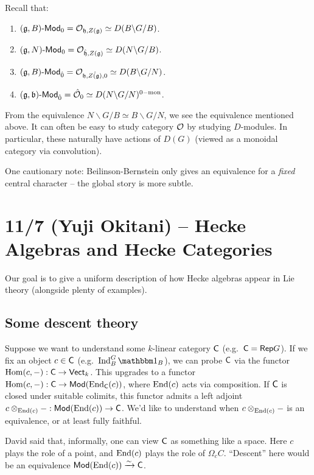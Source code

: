 \documentclass{article}
\begin{document}
Recall that:
\begin{enumerate}
	\item $(\mathfrak{g}, B)\text{-}\mathsf{Mod}_0 = \mathcal{O}_{\mathfrak{h},Z(\mathfrak{g})} \simeq D(B \backslash G / B)$.
	\item $(\mathfrak{g}, N)\text{-}\mathsf{Mod}_0 = \mathcal{O}_{\hat{\mathfrak{h}},Z(\mathfrak{g})} \simeq D(N \backslash G / B)$.
	\item $(\mathfrak{g}, B)\text{-}\mathsf{Mod}_{\hat{0}} = \mathcal{O}_{\mathfrak{h},\hat{Z(\mathfrak{g})},0} \simeq D(B \backslash G / N)$.
	\item $(\mathfrak{g}, \mathfrak{b})\text{-}\mathsf{Mod}_{\hat{0}} = \hat{\mathcal{O}}_0 \simeq D(N \backslash G / N)^{0\mathrm{-mon}}$.
\end{enumerate}

From the equivalence $N \backslash G / B \simeq B \backslash G / N$, we see the equivalence mentioned above.
It can often be easy to study category $\mathcal{O}$ by studying $D$-modules.
In particular, these naturally have actions of $D(G)$ (viewed as a monoidal category via convolution).

One cautionary note: Beilinson-Bernstein only gives an equivalence for a \emph{fixed} central character -- the global story is more subtle.

\section{11/7 (Yuji Okitani) -- Hecke Algebras and Hecke Categories}

Our goal is to give a uniform description of how Hecke algebras appear in Lie theory (alongside plenty of examples).

\subsection{Some descent theory}

Suppose we want to understand some $k$-linear category $\mathsf{C}$ (e.g.\ $\mathsf{C} = \mathsf{Rep} G$).
If we fix an object $c \in \mathsf{C}$ (e.g.\ $\Indop_B^G \onebb_B$), we can probe $\mathsf{C}$ via the functor $\operatorname{Hom}(c, -): \mathsf{C} \to \mathsf{Vect}_k$.
This upgrades to a functor $\operatorname{Hom}(c, -): \mathsf{C} \to \mathsf{Mod}(\operatorname{End}_{\mathsf{C}}(c))$, where $\operatorname{End}(c)$ acts via composition.
If $\mathsf{C}$ is closed under suitable colimits, this functor admits a left adjoint $c \otimes_{\operatorname{End}(c)} -: \mathsf{Mod}(\operatorname{End}(c)) \to \mathsf{C}$.
We'd like to understand when $c \otimes_{\operatorname{End}(c)} -$ is an equivalence, or at least fully faithful.

\begin{rmk}
	David said that, informally, one can view $\mathsf{C}$ as something like a space.
	Here $c$ plays the role of a point, and $\operatorname{End}(c)$ plays the role of $\Omega_c C$.
	``Descent'' here would be an equivalence $\mathsf{Mod}(\operatorname{End}(c)) \xrightarrow{\sim} \mathsf{C}$.
\end{rmk}
\end{document}

